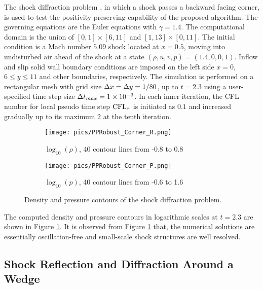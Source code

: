 The shock diffraction problem \cite{zhang2010positivity}, in which a shock passes a backward facing corner,
is used to test the positivity-preserving capability of the proposed algorithm.
The governing equations are the Euler equations with $\gamma = 1.4$.
The computational domain is the union of $[0,1]\times[6,11]$ and $[1,13]\times[0,11]$.
The initial condition is a Mach number $5.09$ shock located at $x=0.5$,
moving into undisturbed air ahead of the shock at a state $(\rho, u, v, p)=(1.4,0,0,1)$.
Inflow and slip solid wall boundary conditions are imposed on
the left side $x = 0$, $6\leq y \leq 11$ and other boundaries, respectively.
The simulation is performed on a rectangular mesh with grid size $\mathrm\Delta x = \mathrm\Delta y = 1/80$,
up to $t=2.3$ using a user-specified time step size $\mathrm\Delta t_{max}=1\times 10^{-3}$.
In each inner iteration, the CFL number for local pseudo time step $\text{CFL}_\tau$ is initiated as $0.1$
and increased gradually up to its maximum $2$ at the tenth iteration.

\begin{figure}[htbp]
    \centering
    \begin{subfigure}{0.5\textwidth}
        \texttt{[image: pics/PPRobust\_Corner\_R.png]}
        \caption[]{$\log_{10}(\rho)$, 40 contour lines from -0.8 to 0.8}
    \end{subfigure}\hfill
    \begin{subfigure}{0.5\textwidth}
        \texttt{[image: pics/PPRobust\_Corner\_P.png]}
        \caption[]{$\log_{10}(p)$, 40 contour lines from -0.6 to 1.6}
    \end{subfigure}
    \caption{Density and pressure contours of the shock diffraction problem.}
    \label{fig:Corner}
\end{figure}

The computed density and pressure contours in logarithmic scales at $t=2.3$ are shown in Figure \ref{fig:Corner}.
It is observed from Figure \ref{fig:Corner} that,
the numerical solutions are essentially oscillation-free and small-scale shock structures are well resolved.


\subsection{Shock Reflection and Diffraction Around a Wedge}

